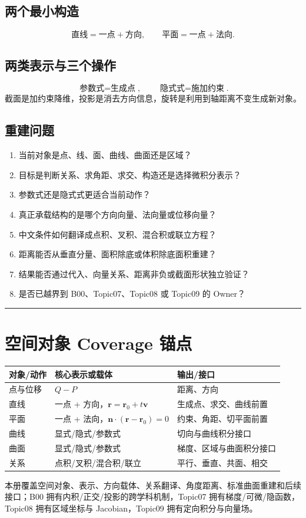 \documentclass[11pt,a4paper]{ctexart}
\begin{document}
\subsection{两个最小构造}
\[
\boxed{\text{直线}=\text{一点}+\text{方向}},
\qquad
\boxed{\text{平面}=\text{一点}+\text{法向}}.
\]

\subsection{两类表示与三个操作}
\[
\boxed{\text{参数式}=\text{生成点}},\qquad
\boxed{\text{隐式式}=\text{施加约束}}.
\]
截面是加约束降维，投影是消去方向信息，旋转是利用到轴距离不变生成新对象。

\subsection{重建问题}
\begin{enumerate}
  \item 当前对象是点、线、面、曲线、曲面还是区域？
  \item 目标是判断关系、求角距、求交、构造还是选择微积分表示？
  \item 参数式还是隐式式更适合当前动作？
  \item 真正承载结构的是哪个方向向量、法向量或位移向量？
  \item 中文条件如何翻译成点积、叉积、混合积或联立方程？
  \item 距离能否从垂直分量、面积除底或体积除底面积重建？
  \item 结果能否通过代入、向量关系、距离非负或截面形状独立验证？
  \item 是否已越界到 B00、Topic07、Topic08 或 Topic09 的 Owner？
\end{enumerate}

\begin{center}\rule{0.5\linewidth}{0.5pt}\end{center}

\appendix
\section{空间对象 Coverage 锚点}

\begin{center}
\begin{tabular}{L{2.55cm}L{5.15cm}L{\dimexpr\linewidth-7.70cm\relax}}
\toprule
对象/动作 & 核心表示或载体 & 输出/接口\\
\midrule
点与位移 & $Q-P$ & 距离、方向\\
直线 & 一点 + 方向，$\mathbf r=\mathbf r_0+t\mathbf v$ & 生成点、求交、曲线前置\\
平面 & 一点 + 法向，$\mathbf n\cdot(\mathbf r-\mathbf r_0)=0$ & 约束、角距、切平面前置\\
曲线 & 显式/隐式/参数式 & 切向与曲线积分接口\\
曲面 & 显式/隐式/参数式 & 梯度、区域与曲面积分接口\\
关系 & 点积/叉积/混合积/联立 & 平行、垂直、共面、相交\\
\bottomrule
\end{tabular}
\end{center}

本册覆盖空间对象、表示、方向载体、关系翻译、角度距离、标准曲面重建和后续接口；B00 拥有内积/正交/投影的跨学科机制，Topic07 拥有梯度/可微/隐函数，Topic08 拥有区域坐标与 Jacobian，Topic09 拥有定向积分与向量场。
\end{document}
